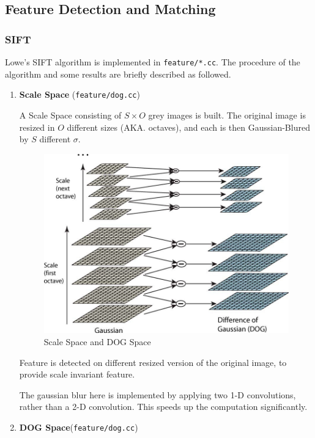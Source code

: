 
\subsection{Feature Detection and Matching}
\subsubsection{SIFT}
Lowe's SIFT algorithm\cite{sift} is implemented in \verb|feature/*.cc|.
The procedure of the algorithm and some results are briefly described as followed.
\begin{enumerate}
  \item \textbf{Scale Space} (\verb|feature/dog.cc|)

    A Scale Space consisting of $ S \times O$ grey images is built.
    The original image is resized in $ O$ different sizes (AKA. octaves), and each is then Gaussian-Blured
    by $ S$ different $ \sigma$.
    \begin{figure}[H]
      \centering
      \includegraphics[scale=0.35]{res/dog.jpg}
      \caption{Scale Space and DOG Space \label{fig:dog}}
    \end{figure}

    Feature is detected on different resized version of the original
    image, to provide scale invariant feature.

    The gaussian blur here is implemented by applying two 1-D convolutions, rather than
    a 2-D convolution. This speeds up the computation significantly.

  \item \textbf{DOG Space}(\verb|feature/dog.cc|)


\end{enumerate}
